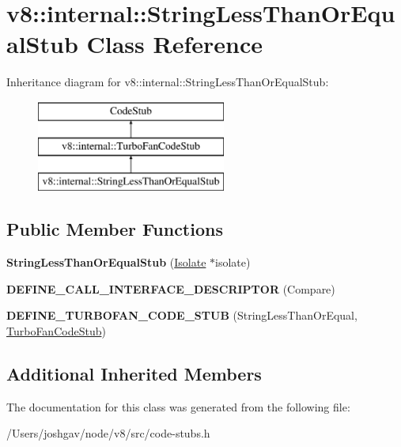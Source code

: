 \hypertarget{classv8_1_1internal_1_1_string_less_than_or_equal_stub}{}\section{v8\+:\+:internal\+:\+:String\+Less\+Than\+Or\+Equal\+Stub Class Reference}
\label{classv8_1_1internal_1_1_string_less_than_or_equal_stub}
Inheritance diagram for v8\+:\+:internal\+:\+:String\+Less\+Than\+Or\+Equal\+Stub\+:\begin{figure}[H]
\begin{center}
\leavevmode
\includegraphics[height=3.000000cm]{classv8_1_1internal_1_1_string_less_than_or_equal_stub}
\end{center}
\end{figure}
\subsection*{Public Member Functions}
\begin{DoxyCompactItemize}
\item 
{\bfseries String\+Less\+Than\+Or\+Equal\+Stub} (\hyperlink{classv8_1_1internal_1_1_isolate}{Isolate} $\ast$isolate)\hypertarget{classv8_1_1internal_1_1_string_less_than_or_equal_stub_a9a3335ad2d0139624a0c70dc82d75626}{}\label{classv8_1_1internal_1_1_string_less_than_or_equal_stub_a9a3335ad2d0139624a0c70dc82d75626}

\item 
{\bfseries D\+E\+F\+I\+N\+E\+\_\+\+C\+A\+L\+L\+\_\+\+I\+N\+T\+E\+R\+F\+A\+C\+E\+\_\+\+D\+E\+S\+C\+R\+I\+P\+T\+OR} (Compare)\hypertarget{classv8_1_1internal_1_1_string_less_than_or_equal_stub_a01a5852ce93f00aa8c7204f7785201ab}{}\label{classv8_1_1internal_1_1_string_less_than_or_equal_stub_a01a5852ce93f00aa8c7204f7785201ab}

\item 
{\bfseries D\+E\+F\+I\+N\+E\+\_\+\+T\+U\+R\+B\+O\+F\+A\+N\+\_\+\+C\+O\+D\+E\+\_\+\+S\+T\+UB} (String\+Less\+Than\+Or\+Equal, \hyperlink{classv8_1_1internal_1_1_turbo_fan_code_stub}{Turbo\+Fan\+Code\+Stub})\hypertarget{classv8_1_1internal_1_1_string_less_than_or_equal_stub_a427d09b46b2666ad70ebb7f30aa4939f}{}\label{classv8_1_1internal_1_1_string_less_than_or_equal_stub_a427d09b46b2666ad70ebb7f30aa4939f}

\end{DoxyCompactItemize}
\subsection*{Additional Inherited Members}


The documentation for this class was generated from the following file\+:\begin{DoxyCompactItemize}
\item 
/\+Users/joshgav/node/v8/src/code-\/stubs.\+h\end{DoxyCompactItemize}
